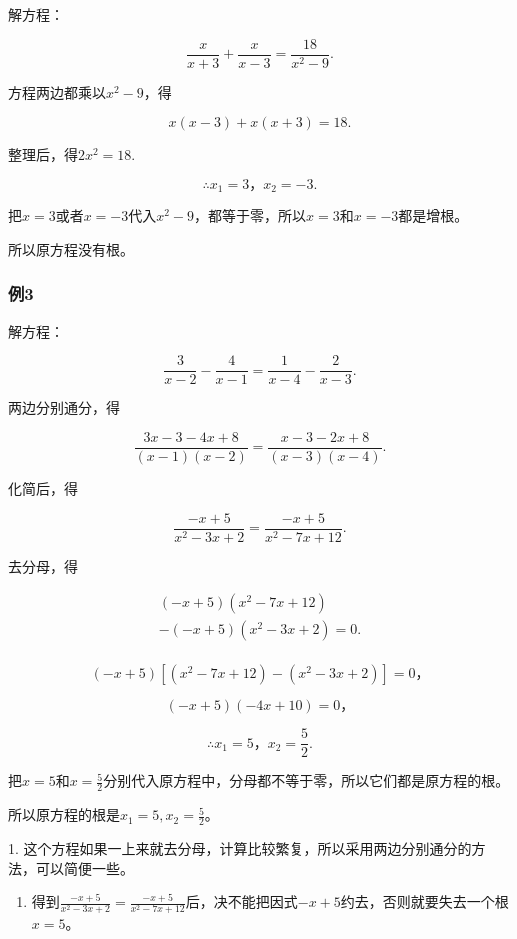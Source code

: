解方程：

\[
\frac{x}{x + 3} + \frac{x}{x - 3} = \frac{18}{x ^ {2} - 9}.
\]

 方程两边都乘以\(x^{2} - 9\)，得

\[
x (x - 3) + x (x + 3) = 18.
\]

整理后，得\(2x^{2}=18.\)

\[
\therefore x _ {1} = 3\text{，} x _ {2} = - 3.
\]

把\(x = 3\)或者\(x = -3\)代入\(x^2 - 9\)，都等于零，所以\(x = 3\)和\(x = -3\)都是增根。

所以原方程没有根。

\subsubsection{例3}

解方程：

\[
\frac{3}{x - 2} - \frac{4}{x - 1} = \frac{1}{x - 4} - \frac{2}{x - 3}.
\]

 两边分别通分，得

\[
\frac{3 x - 3 - 4 x + 8}{(x - 1) (x - 2)} = \frac{x - 3 - 2 x + 8}{(x - 3) (x - 4)}.
\]

化简后，得

\[
\frac{- x + 5}{x ^ {2} - 3 x + 2} = \frac{- x + 5}{x ^ {2} - 7 x + 12}.
\]

去分母，得

\[
\begin{array}{l} (- x + 5) (x ^ {2} - 7 x + 12) \\ - (- x + 5) (x ^ {2} - 3 x + 2) = 0. \\ \end{array}
\]

\[
(- x + 5) [ (x ^ {2} - 7 x + 12) - (x ^ {2} - 3 x + 2) ] = 0\text{，}
\]

\[
(- x + 5) (- 4 x + 10) = 0\text{，}
\]

\[
\therefore x _ {1} = 5\text{，} x _ {2} = \frac{5}{2}.
\]

把\(x = 5\)和\(x = \frac{5}{2}\)分别代入原方程中，分母都不等于零，所以它们都是原方程的根。

所以原方程的根是\(x_{1} = 5, x_{2} = \frac{5}{2}\)。

 1.
这个方程如果一上来就去分母，计算比较繁复，所以采用两边分别通分的方法，可以简便一些。

\begin{enumerate}[start=2]
\item
  得到\(\frac{-x + 5}{x^2 - 3x + 2} = \frac{-x + 5}{x^2 - 7x + 12}\)后，决不能把因式\(-x + 5\)约去，否则就要失去一个根\(x = 5\)。
\end{enumerate}

